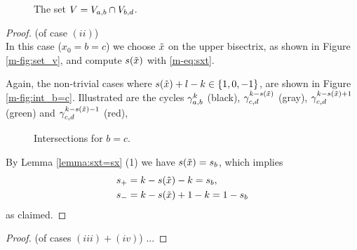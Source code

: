 \documentclass[main.tex]{subfiles}
\begin{document}
    \begin{figure}[H]
      \begin{center}
   
      \end{center}
    \caption{The set $V = V_{a,b} \cap V_{b,d}$.}
    \label{fig:set_v}
\end{figure}
   
   \begin{proof}\let\qed\relax (of case $(ii)$) \\
   In this case ($x_0 = b = c$) we choose $\tilde{x}$ on the upper bisectrix, as shown in Figure \ref{m-fig:set_v}, 
   and compute $s(\tilde{x})$ with \eqref{m-eq:sxt}.
   
   Again, the non-trivial cases where $s(\tilde{x}) + l - k \in \{1,0,-1\}$, are shown in Figure \ref{m-fig:int_b=c}.
   Illustrated are the cycles $\gamma_{a,b}^k$ (black), $\gamma_{c,d}^{k-s(\tilde{x})}$ (gray), $\gamma_{c,d}^{k-s(\tilde{x}) + 1 }$ (green) and
    $\gamma_{c,d}^{k-s(\tilde{x})-1}$ (red),
    \begin{figure}[H]
      \begin{center}
   
      \end{center}
    \caption{Intersections for $b=c$.}
    \label{fig:int_b=c}
   \end{figure}
    By Lemma \ref{lemma:sxt=sx} (1) we have $s(\tilde{x}) = s_b$, which implies
    \begin{align*}
    & s_+ = k-s(\tilde{x})-k = s_b, \\
    & s_- = k-s(\tilde{x})+1-k = 1-s_b
    \end{align*}
  as claimed.
  \end{proof}
 
 \begin{proof}(of cases $(iii) + (iv)$)
  \todo ...
 \end{proof}

 
  
\end{document}
